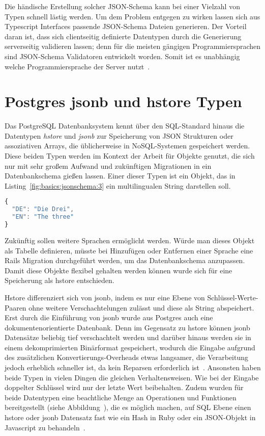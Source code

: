 Die händische Erstellung solcher JSON-Schema kann bei einer Vielzahl von Typen schnell lästig werden.
Um dem Problem entgegen zu wirken lassen sich aus Typescript Interfaces passende JSON-Schema Dateien generieren.
Der Vorteil daran ist, dass sich clientseitig definierte Datentypen durch die Generierung serverseitig validieren lassen;
denn für die meisten gängigen Programmiersprachen sind JSON-Schema Validatoren entwickelt worden.
Somit ist es unabhängig welche Programmiersprache der Server nutzt~\cite{json-schema-implementations}.


\section{Postgres jsonb und hstore Typen}
\label{sec:basics:postgres}
Das PostgreSQL Datenbanksystem kennt über den SQL-Standard hinaus die Datentypen \emph{hstore} und \emph{jsonb} zur Speicherung von JSON Strukturen oder assoziativen Arrays, die üblicherweise in NoSQL-Systemen gespeichert werden.
Diese beiden Typen werden im Kontext der Arbeit für Objekte genutzt, die sich nur mit sehr großem Aufwand und zukünftigen Migrationen in ein Datenbankschema gießen lassen. Einer dieser Typen ist ein Objekt, das in Listing~\ref{fig:basics:jsonschema:3} ein multilingualen String darstellen soll. 

\begin{lstlisting}[language=Javascript,float=h!,caption={Multilinguales Objekt}, label={fig:basics:jsonschema:3}]
{
  "DE": "Die Drei",
  "EN": "The three"
}
\end{lstlisting}

Zukünftig sollen weitere Sprachen ermöglicht werden. Würde man dieses Objekt als Tabelle definieren, müsste bei Hinzufügen oder Entfernen einer Sprache eine Rails Migration durchgeführt werden, um das Datenbankschema anzupassen. Damit diese Objekte flexibel gehalten werden können wurde sich für eine Speicherung als hstore entschieden.

Hstore differenziert sich von jsonb, indem es nur eine Ebene von Schlüssel-Werte-Paaren ohne weitere Verschachtelungen zulässt und diese als String abspeichert. Erst durch die Einführung von jsonb wurde aus Postgres auch eine dokumentenorientierte Datenbank.
Denn im Gegensatz zu hstore können jsonb Datensätze beliebig tief verschachtelt werden und
darüber hinaus werden sie in einem dekomprimierten Binärformat gespeichert, wodurch die Eingabe aufgrund des zusätzlichen Konvertierungs-Overheads etwas langsamer,
die Verarbeitung jedoch erheblich schneller ist, da kein Reparsen erforderlich ist~\cite{postgresql-json}.
Ansonsten haben beide Typen in vielen Dingen die gleichen Verhaltensweisen. Wie bei der Eingabe doppelter Schlüssel wird nur der letzte Wert beibehalten.
Zudem wurden für beide Datentypen eine beachtliche Menge an Operationen und Funktionen bereitgestellt (siehe Abbildung~), die es möglich machen,
auf SQL Ebene einen hstore oder jsonb Datensatz fast wie ein Hash in Ruby oder ein JSON-Objekt in Javascript zu behandeln~\cite{postgresql-hstore}.


